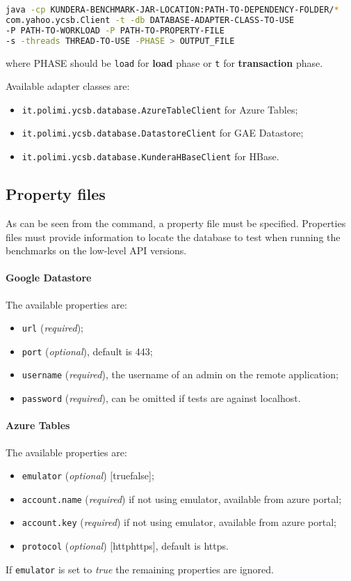 \begin{lstlisting}[language=bash, caption=Run low-level API benchmarks, numbers=none]
java -cp KUNDERA-BENCHMARK-JAR-LOCATION:PATH-TO-DEPENDENCY-FOLDER/*
com.yahoo.ycsb.Client -t -db DATABASE-ADAPTER-CLASS-TO-USE
-P PATH-TO-WORKLOAD -P PATH-TO-PROPERTY-FILE 
-s -threads THREAD-TO-USE -PHASE > OUTPUT_FILE
\end{lstlisting}

\noindent where PHASE should be \texttt{load} for \textbf{load} phase or \texttt{t} for \textbf{transaction} phase.

\newparagraph  Available adapter classes are:
\begin{itemize}
\item \texttt{it.polimi.ycsb.database.AzureTableClient} for Azure Tables;
\item \texttt{it.polimi.ycsb.database.DatastoreClient} for GAE Datastore;
\item \texttt{it.polimi.ycsb.database.KunderaHBaseClient} for HBase.
\end{itemize}

\subsection{Property files}
As can be seen from the command, a property file must be specified. Properties files must provide information to locate the database to test when running the benchmarks on the low-level API versions.

\paragraph{Google Datastore} The available properties are:
\begin{itemize}
\item \texttt{url} (\textit{required});
\item \texttt{port} (\textit{optional}), default is 443;
\item \texttt{username} (\textit{required}), the username of an admin on the remote application;
\item \texttt{password} (\textit{required}), can be omitted if tests are against localhost.
\end{itemize}

\paragraph{Azure Tables} The available properties are:
\begin{itemize}
\item \texttt{emulator} (\textit{optional}) [true\textbar false];
\item \texttt{account.name} (\textit{required}) if not using emulator, available from azure portal;
\item \texttt{account.key} (\textit{required}) if not using emulator, available from azure portal;
\item \texttt{protocol} (\textit{optional}) [http\textbar https], default is https.
\end{itemize}
\noindent If \texttt{emulator} is set to \textit{true} the remaining properties are ignored.

